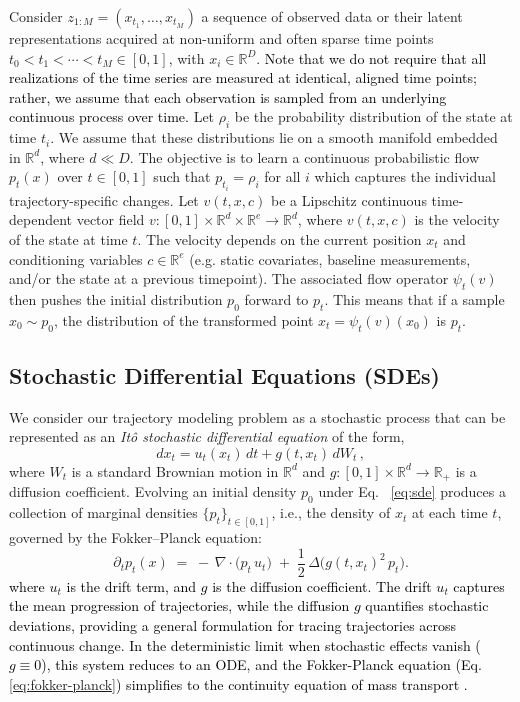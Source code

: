\documentclass[twoside]{article}
\newcommand{\bc}[1]{\textcolor{black}{#1}}
\begin{document}
Consider \(z_{1:M} = (x_{t_1}, \ldots, x_{t_M})\) a sequence of observed data or their latent representations acquired at non-uniform and often sparse time points \(t_0 < t_1 < \cdots < t_M \in [0,1]\), with \(x_i \in \mathbb{R}^D\). \textcolor{black}{Note that we do not require that all realizations of the time series are measured at identical, aligned time points; rather, we assume that each observation is sampled from an underlying continuous process over time.} Let \(\rho_i\) be the probability distribution of the state at time \(t_i\). We assume that these distributions lie on a smooth manifold embedded in \(\mathbb{R}^d\), where \(d \ll D\). The objective is to learn a continuous probabilistic flow \(p_t(x)\) over \(t \in [0,1]\) such that \(p_{t_i} = \rho_i\) for all \(i\) which captures the individual trajectory-specific changes. Let $v(t, x, c)$ be a Lipschitz continuous time-dependent vector field  \(v : [0,1] \times \mathbb{R}^d \times \mathbb{R}^e \rightarrow \mathbb{R}^d\), where \(v(t, x, c)\) is the velocity of the state at time \(t\). The velocity depends on the current position \(x_t\) and conditioning variables \(c \in \mathbb{R}^e\) (e.g. static covariates, baseline measurements, and/or the state at a previous timepoint). The associated flow operator \(\psi_t(v)\) then pushes the initial distribution \(p_0\) forward to \(p_t\). This means that if a sample \(x_0 \sim p_0\), the distribution of the transformed point \(x_t = \psi_t(v)(x_0)\) is \(p_t\).




\subsection{Stochastic Differential Equations (SDEs)}
We consider our trajectory modeling problem as a stochastic process that can be represented as an
\emph{Itô stochastic differential
equation} of the form,
\begin{equation}
d x_t = u_t(x_t)\,dt + g(t,x_t)\,dW_t \, ,
    \label{eq:sde}
\end{equation}
where \(W_t\) is a standard Brownian motion in \(\mathbb{R}^{d}\) and
\(g:[0,1] \times\mathbb{R}^d  \!\to\!\mathbb{R}_+\)
is a diffusion coefficient.
Evolving an initial density \(p_0\) under Eq. ~\eqref{eq:sde} produces a collection of marginal
densities \(\{p_t\}_{t\in[0,1]}\), i.e., the density of $x_t$ at each time $t$, governed by the Fokker--Planck equation:
\begin{equation}
\partial_t p_t(x)
\;=\;
-\,\nabla \cdot \big(p_t\,u_t\big)
\;+\;\frac{1}{2}\,\Delta\!\big(g(t, x_t)^2\,p_t\big).
\label{eq:fokker-planck}
\end{equation}
\bc{where $u_t$ is the drift term, and $g$ is the diffusion coefficient. 
The drift $u_t$ captures the mean progression of trajectories, while the diffusion $g$ quantifies stochastic deviations, providing a general formulation for tracing trajectories across continuous change.
In the deterministic limit when stochastic effects vanish ($g \equiv 0$), this system reduces to an ODE, and the Fokker-Planck equation (Eq.\ref{eq:fokker-planck}) simplifies to the continuity equation of mass transport \citep{gardiner2009stochastic}.}
\end{document}
